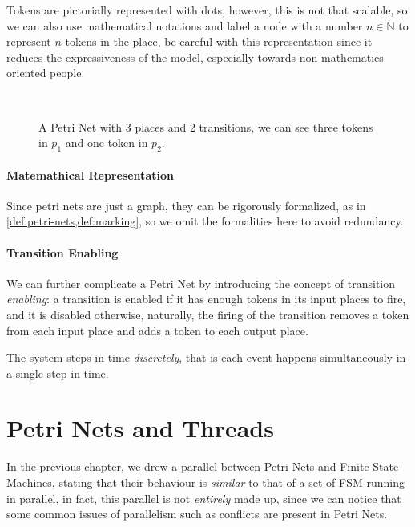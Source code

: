 \documentclass[openright, twoside, twocolumn]{report}
\newcommand{\incsvg}[2]{%
	\def\svgwidth{\columnwidth}
	\graphicspath{{#1}}
	
}
\begin{document}
    Tokens are pictorially represented with dots, however, this is not that scalable, so we can also use mathematical
    notations and label a node with a number $n \in \mathbb{N}$ to represent $n$ tokens in the place, be careful with
    this representation since it reduces the expressiveness of the model, especially towards non-mathematics oriented
    people.

    \begin{figure}[ht]
      \centering
      \incsvg{fig}{fig/pnet}\\
      \label{fig:pnet}
      \caption{%
        A Petri Net with 3 places and 2 transitions, we can
        see three tokens in $p_1$ and one token in $p_2$.
      }
    \end{figure}

    \paragraph{Matemathical Representation}
    Since petri nets are just a graph, they can be rigorously formalized, as in \cref{def:petri-nets,def:marking}, so we omit
    the formalities here to avoid redundancy.

    \paragraph{Transition Enabling}

    We can further complicate a Petri Net by introducing the concept of transition \emph{enabling}: a transition
    is enabled if it has enough tokens in its input places to fire, and it is disabled otherwise, naturally,
    the firing of the transition removes a token from each input place and adds a token to each output place.

    The system steps in time \emph{discretely}, that is each event happens simultaneously in a single step in
    time.

    \section{Petri Nets and Threads}

    In the previous chapter, we drew a parallel between Petri Nets and Finite State Machines, stating that their behaviour is \emph{similar} to that of a set of FSM running in parallel, in fact, this parallel is not \emph{entirely} made up, since we can notice that some common issues of parallelism such as conflicts are present in Petri Nets.
\end{document}
